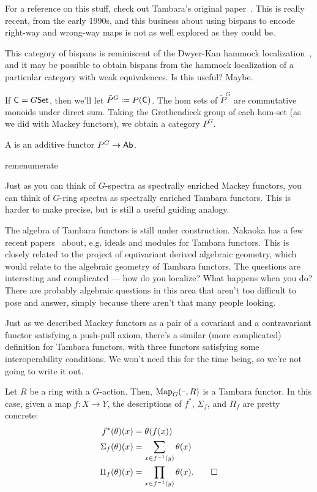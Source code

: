 For a reference on this stuff, check out Tambara's original paper~\cite{Tambara}. This is really recent, from the
early 1990s, and this business about using bispans to encode right-way and wrong-way maps is not as well explored
as they could be.
\begin{rem}
This category of bispans is reminiscent of the Dwyer-Kan hammock localization~\cite{Hammock}, and it may be
possible to obtain bispans from the hammock localization of a particular category with weak equivalences. Is this
useful? Maybe.
\end{rem}
If $\mathsf C = G\mathsf{Set}$, then we'll let $\tilde{P}^G\coloneqq P(\mathsf C)$. The hom sets of $\tilde{P}^G$ are commutative
monoids under direct sum. Taking the Grothendieck group of each hom-set (as we did with Mackey functors), we obtain
a category $P^G$.
\begin{defn}
A  is an additive functor $P^G\to\mathsf{Ab}$.
\end{defn}
\begin{comp}{rem}{enumerate}
	\item Just as you can think of $G$-spectra as spectrally enriched Mackey functors, you can think of $G$-ring
	spectra as spectrally enriched Tambara functors. This is harder to make precise, but is still a useful guiding
	analogy.
	\item The algebra of Tambara functors is still under construction. Nakaoka has a few recent
	papers~\cite{NakaokaIdeals, NakaokaFractions, NakaokaSpectrum} about, e.g. ideals and modules for Tambara
	functors. This is closely related to the project of equivariant derived algebraic geometry, which would relate
	to the algebraic geometry of Tambara functors. The questions are interesting and complicated --- how do you
	localize? What happens when you do?  There are probably algebraic questions in this area that aren't too
	difficult to pose and answer, simply because there aren't that many people looking.
	\item Just as we described Mackey functors as a pair of a covariant and a contravariant functor satisfying a
	push-pull axiom, there's a similar (more complicated) definition for Tambara functors, with three functors
	satisfying some interoperability conditions. We won't need this for the time being, so we're not going to write
	it out. \qedhere
\end{comp}
\begin{exm}
Let $R$ be a ring with a $G$-action. Then, $\operatorname{Map}_G(\text{--},R)$ is a Tambara functor. In this case, given a map $f\colon
X\to Y$, the descriptions of $f^*$, $\Sigma_f$, and $\Pi_f$ are pretty concrete:
\begin{align*}
	f^*(\theta)(x) &= \theta(f(x))\\
	\Sigma_f(\theta)(x) &= \sum_{x\in f^{-1}(y)} \theta(x)\\
	\Pi_f(\theta)(x) &= \prod_{x\in f^{-1}(y)} \theta(x).\qedhere
\end{align*}
\end{exm}
